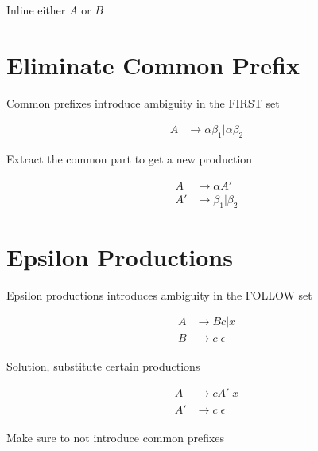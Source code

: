     Inline either $ A $ or $ B $

\section{Eliminate Common Prefix}
\label{section: grammar/eliminate common prefix}

  Common prefixes introduce ambiguity in the FIRST set

  \begin{align*}
    A &\to \alpha \beta_{1} | \alpha \beta_{2}
  \end{align*}

  Extract the common part to get a new production

  \begin{align*}
    A &\to \alpha A' \\
    A' &\to \beta_{1} | \beta_{2}
  \end{align*}

\section{Epsilon Productions}

  Epsilon productions introduces ambiguity in the FOLLOW set

  \begin{align*}
    A &\to Bc | x \\
    B &\to c | \epsilon
  \end{align*}

  Solution, substitute certain productions

  \begin{align*}
    A &\to c A' | x \\
    A' &\to c | \epsilon
  \end{align*}

  Make sure to not introduce common prefixes
